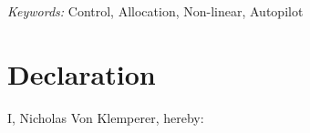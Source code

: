 \documentclass[a4paper, 11pt, oneside, openright, parskip=full]{book}
\newcommand{\auth}{Nicholas Von Klemperer}								%
\newcommand{\key}{Control, Allocation, Non-linear, Autopilot}					   %
\begin{document}
\begin{titlepage}
		\vskip 15mm	
	\begin{normalsize}				
		{\itshape Keywords:}
		\key			
	\end{normalsize}	
\end{titlepage}

\frontmatter
\afterpage{\null\newpage}
\chapter{Declaration}				
\label{ch:decl}
I, \auth,  hereby:
\end{document}
